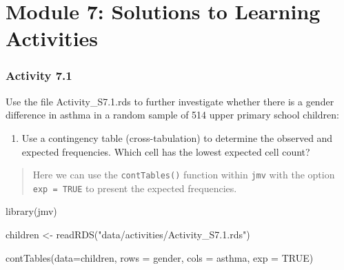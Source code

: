 \documentclass[
]{memoir}
\newenvironment{Shaded}{\begin{snugshade}}{\end{snugshade}}
\newcommand{\AttributeTok}[1]{\textcolor[rgb]{0.77,0.63,0.00}{#1}}
\newcommand{\ConstantTok}[1]{\textcolor[rgb]{0.00,0.00,0.00}{#1}}
\newcommand{\FunctionTok}[1]{\textcolor[rgb]{0.00,0.00,0.00}{#1}}
\newcommand{\NormalTok}[1]{#1}
\newcommand{\OtherTok}[1]{\textcolor[rgb]{0.56,0.35,0.01}{#1}}
\newcommand{\StringTok}[1]{\textcolor[rgb]{0.31,0.60,0.02}{#1}}
\providecommand{\tightlist}{%
  \setlength{\itemsep}{0pt}\setlength{\parskip}{0pt}}
\begin{document}
\hypertarget{module-7-solutions-to-learning-activities}{%
\chapter*{Module 7: Solutions to Learning Activities}\label{module-7-solutions-to-learning-activities}}

\hypertarget{activity-7.1}{%
\subsection*{Activity 7.1}\label{activity-7.1}}

Use the file Activity\_S7.1.rds to further investigate whether there is a gender difference in asthma in a random sample of 514 upper primary school children:

\begin{enumerate}
\def\labelenumi{\alph{enumi})}
\tightlist
\item
  Use a contingency table (cross-tabulation) to determine the observed and expected frequencies. Which cell has the lowest expected cell count?
\end{enumerate}

\begin{quote}
Here we can use the \texttt{contTables()} function within \texttt{jmv} with the option \texttt{exp\ =\ TRUE} to present the expected frequencies.
\end{quote}

\begin{Shaded}
\begin{Highlighting}[]
\FunctionTok{library}\NormalTok{(jmv)}

\NormalTok{children }\OtherTok{\textless{}{-}} \FunctionTok{readRDS}\NormalTok{(}\StringTok{"data/activities/Activity\_S7.1.rds"}\NormalTok{)}

\FunctionTok{contTables}\NormalTok{(}\AttributeTok{data=}\NormalTok{children, }\AttributeTok{rows =}\NormalTok{ gender, }\AttributeTok{cols =}\NormalTok{ asthma,}
           \AttributeTok{exp =} \ConstantTok{TRUE}\NormalTok{)}
\end{Highlighting}
\end{Shaded}
\end{document}
